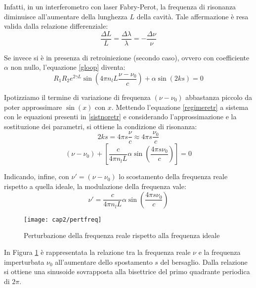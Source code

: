 Infatti, in un interferometro con laser Fabry-Perot, la frequenza di risonanza diminuisce all'aumentare della lunghezza $L$ della cavità. Tale affermazione è resa valida dalla relazione differenziale:
\begin{equation}
	\frac{\Delta L}{L} = \frac{\Delta \lambda}{\lambda} = - \frac{\Delta \nu}{\nu}
\end{equation}

Se invece si è in presenza di retroiniezione (secondo caso), ovvero con coefficiente $\alpha$ non nullo, l'equazione \ref{gloop} diventa:
\begin{equation}
	R_1R_2e^{2\gamma L}\sin{ \left (4\pi n_l L \frac{\nu - \nu_0}{c} \right )} + \alpha \sin{(2ks)} = 0
	\label{regimeretr}
\end{equation}

Ipotizziamo il termine di variazione di frequenza $(\nu-\nu_0)$ abbastanza piccolo da poter approssimare $\sin(x)$ con $x$. Mettendo l'equazione \ref{regimeretr} a sistema con le equazioni presenti in \ref{sistnoretr} e considerando l'approssimazione e la sostituzione dei parametri, si ottiene la condizione di risonanza:
\begin{equation}
	2ks=4\pi s \frac{\nu}{c} \approx 4\pi s \frac{\nu_0}{c}
\end{equation}
\begin{equation}
	(\nu - \nu_0) + \left[ \frac{c}{4\pi n_l L}\alpha \sin{\left (\frac{4 \pi s \nu_0}{c}\right )} \right] = 0
\end{equation}

Indicando, infine, con $\nu'=(\nu-\nu_0)$ lo scostamento della frequenza reale rispetto a quella ideale, la modulazione della frequenza vale: 
\begin{equation}
	\nu'= \frac{c}{4\pi n_l L} \alpha \sin \left ( \frac{4 \pi s \nu_0}{c} \right )
\end{equation}

\begin{figure}  
  \begin{center}
    \texttt{[image: cap2/pertfreq]}
    \caption{Perturbazione della frequenza reale rispetto alla frequenza ideale}
    \label{pertfreq}
  \end{center}
\end{figure}

In Figura \ref{pertfreq} è rappresentata la relazione tra la frequenza reale $\nu$ e la frequenza imperturbata $\nu_0$ all'aumentare dello spostamento $s$ del bersaglio. Dalla relazione si ottiene una sinusoide sovrapposta alla bisettrice del primo quadrante periodica di $2\pi$. 

